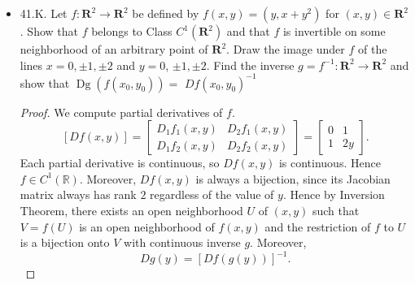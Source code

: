 \begin{itemize}
\begin{proof}
	Let $\varepsilon > 0$ and we want to show $h$ surjective near $0$. Given a neighborhood $(-\varepsilon, \varepsilon)$ of $h(0) = 0$, we want to find a suitable neighborhood  $(-\delta, \delta)$ of $0$ whose image contains $(-\varepsilon, \varepsilon)$. We verify that $h$ is unbounded and continuous. $\sin \frac{1}{x} >0 > \sin -\frac{1}{x} $ for $x>0$ large enough, so $h(M) \ge  M$ and $h(-M) < -M$. Also we can assume $(-\varepsilon, \varepsilon) \subset (-M, M)$ since $M$ is assumed to be large. Thus we can choose  $\alpha \in (-M, 0)$ and $\beta \in (0, M)$ such that $h(\alpha) = -\varepsilon$ and $h(\beta) = \varepsilon$. Now $h(\alpha, \beta) \supset (-\varepsilon, \varepsilon)$ by IVT.

	Finally we verify $Dh(0)$ invertible. This is obvious because
	\[
		Dh(0)(x) = h(0) + h'(0) x = 0 + 1 x = x
	.\] 
\end{proof}

\item 41.K. Let $f: \mathbf{R}^2 \rightarrow \mathbf{R}^2$ be defined by $f(x, y)=\left(y, x+y^2\right)$ for $(x, y) \in \mathbf{R}^2$. Show that $f$ belongs to Class $C^1\left(\boldsymbol{R}^2\right)$ and that $f$ is invertible on some neighborhood of an arbitrary point of $\boldsymbol{R}^2$. Draw the image under $f$ of the lines $x=0, \pm 1, \pm 2$ and $y=0$, $\pm 1, \pm 2$. Find the inverse $g=f^{-1}: \mathbf{R}^2 \rightarrow \mathbf{R}^2$ and show that $\operatorname{Dg}\left(f\left(x_0, y_0\right)\right)=$ $D f\left(x_0, y_0\right)^{-1}$
\begin{proof}
	We compute partial derivatives of $f$. 
	\[
		[Df(x,y)] = 
		\begin{bmatrix}
		D_1f_1(x,y) & D_2f_1(x,y)\\
		D_1f_2(x,y) & D_2f_2(x,y)
		\end{bmatrix}
		=
		\begin{bmatrix}
		0 & 1\\
		1 & 2y
		\end{bmatrix}
	.\] 
	Each partial derivative is continuous, so $Df(x,y)$ is continuous. Hence $f \in C^1(\mathbb{R})$. Moreover, $Df(x,y)$ is always a bijection, since its Jacobian matrix always has rank $2$ regardless of the value of $y$. Hence by Inversion Theorem, there exists an open neighborhood $U$ of $(x,y)$ such that $V = f(U)$ is an open neighborhood of $f(x,y)$ and the restriction of $f$ to $U$ is a bijection onto $V$ with continuous inverse $g$. Moreover,
	\[
		Dg(y) = [Df(g(y))]^{-1}
	.\] 
\end{proof}
	\newpage


\end{itemize}
